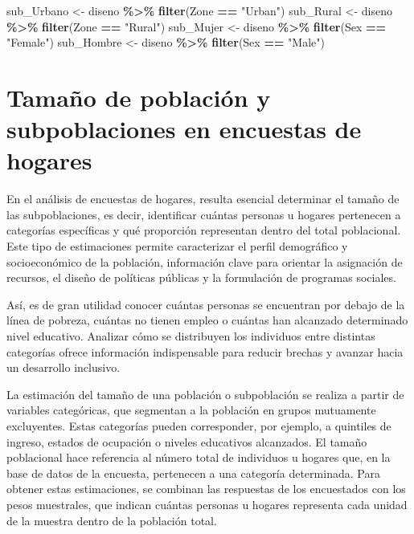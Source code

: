 \documentclass[
  spanish,
  12pt,
]{book}
\newenvironment{Shaded}{\begin{snugshade}}{\end{snugshade}}
\newcommand{\FunctionTok}[1]{\textcolor[rgb]{0.13,0.29,0.53}{\textbf{#1}}}
\newcommand{\NormalTok}[1]{#1}
\newcommand{\OtherTok}[1]{\textcolor[rgb]{0.56,0.35,0.01}{#1}}
\newcommand{\SpecialCharTok}[1]{\textcolor[rgb]{0.81,0.36,0.00}{\textbf{#1}}}
\newcommand{\StringTok}[1]{\textcolor[rgb]{0.31,0.60,0.02}{#1}}
\begin{document}
\begin{Shaded}
\begin{Highlighting}[]
\NormalTok{sub\_Urbano }\OtherTok{\textless{}{-}}\NormalTok{ diseno }\SpecialCharTok{\%\textgreater{}\%}  \FunctionTok{filter}\NormalTok{(Zone }\SpecialCharTok{==} \StringTok{"Urban"}\NormalTok{)}
\NormalTok{sub\_Rural  }\OtherTok{\textless{}{-}}\NormalTok{ diseno }\SpecialCharTok{\%\textgreater{}\%}  \FunctionTok{filter}\NormalTok{(Zone }\SpecialCharTok{==} \StringTok{"Rural"}\NormalTok{)}
\NormalTok{sub\_Mujer  }\OtherTok{\textless{}{-}}\NormalTok{ diseno }\SpecialCharTok{\%\textgreater{}\%}  \FunctionTok{filter}\NormalTok{(Sex }\SpecialCharTok{==} \StringTok{"Female"}\NormalTok{)}
\NormalTok{sub\_Hombre }\OtherTok{\textless{}{-}}\NormalTok{ diseno }\SpecialCharTok{\%\textgreater{}\%}  \FunctionTok{filter}\NormalTok{(Sex }\SpecialCharTok{==} \StringTok{"Male"}\NormalTok{)}
\end{Highlighting}
\end{Shaded}

\section{Tamaño de población y subpoblaciones en encuestas de hogares}\label{tamauxf1o-de-poblaciuxf3n-y-subpoblaciones-en-encuestas-de-hogares}

En el análisis de encuestas de hogares, resulta esencial determinar el tamaño de las subpoblaciones, es decir, identificar cuántas personas u hogares pertenecen a categorías específicas y qué proporción representan dentro del total poblacional. Este tipo de estimaciones permite caracterizar el perfil demográfico y socioeconómico de la población, información clave para orientar la asignación de recursos, el diseño de políticas públicas y la formulación de programas sociales.

Así, es de gran utilidad conocer cuántas personas se encuentran por debajo de la línea de pobreza, cuántas no tienen empleo o cuántas han alcanzado determinado nivel educativo. Analizar cómo se distribuyen los individuos entre distintas categorías ofrece información indispensable para reducir brechas y avanzar hacia un desarrollo inclusivo.

La estimación del tamaño de una población o subpoblación se realiza a partir de variables categóricas, que segmentan a la población en grupos mutuamente excluyentes. Estas categorías pueden corresponder, por ejemplo, a quintiles de ingreso, estados de ocupación o niveles educativos alcanzados. El tamaño poblacional hace referencia al número total de individuos u hogares que, en la base de datos de la encuesta, pertenecen a una categoría determinada. Para obtener estas estimaciones, se combinan las respuestas de los encuestados con los pesos muestrales, que indican cuántas personas u hogares representa cada unidad de la muestra dentro de la población total.
\end{document}

